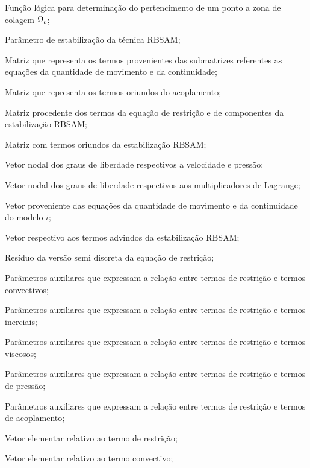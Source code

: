 \begin{simbolos}
   \item[$\chi$] Função lógica para determinação do pertencimento de um ponto a zona de colagem $\Omega_c$;
   \item[$\tauArlequin$] Parâmetro de estabilização da técnica RBSAM;
   \item[$\mathbf{K}$] Matriz que representa os termos provenientes das submatrizes referentes as equações da quantidade de movimento e da continuidade;
   \item[$\mathbf{\hat{L}}$] Matriz que representa os termos oriundos do acoplamento;
   \item[$\mathbf{L}^{T}$]{Matriz procedente dos termos da equação de restrição e de componentes da estabilização RBSAM;}
   \item[$\mathbf{E}$] Matriz com termos oriundos da estabilização RBSAM;
   \item[$\mathbf{\bar{U}}$] Vetor nodal dos graus de liberdade respectivos a velocidade e pressão;
   \item[$\LagrangeMultiplier$] Vetor nodal dos graus de liberdade respectivos aos multiplicadores de Lagrange;
   \item[$\mathbf{F}_i$] Vetor proveniente das equações da quantidade de movimento e da continuidade do modelo $i$;
   \item[$\mathbf{F}_{\LagrangeMultiplier}$] Vetor respectivo aos termos advindos da estabilização RBSAM;
   \item[$\NNSL$] Resíduo da versão semi discreta da equação de restrição;
   \item[$\tau_{A},\tau_{A}^{0},\tau_{A}^{1}$] Parâmetros auxiliares que expressam a relação entre termos de restrição e termos convectivos;
   \item[$\tau_{B},\tau_{B}^{0},\tau_{B}^{1}$] Parâmetros auxiliares que expressam a relação entre termos de restrição e termos inerciais;
   \item[$\tau_{C},\tau_{C}^{0},\tau_{C}^{1}$] Parâmetros auxiliares que expressam a relação entre termos de restrição e termos viscosos;
   \item[$\tau_{D},\tau_{D}^{0},\tau_{D}^{1}$] Parâmetros auxiliares que expressam a relação entre termos de restrição e termos de pressão;
   \item[$\tau_{E},\tau_{E}^{0},\tau_{E}^{1}$] Parâmetros auxiliares que expressam a relação entre termos de restrição e termos de acoplamento;
   \item[$\mathbf{M}_{\lambda}$] Vetor elementar relativo ao termo de restrição;
   \item[$\mathbf{t}$] Vetor elementar relativo ao termo convectivo;

\end{simbolos}

